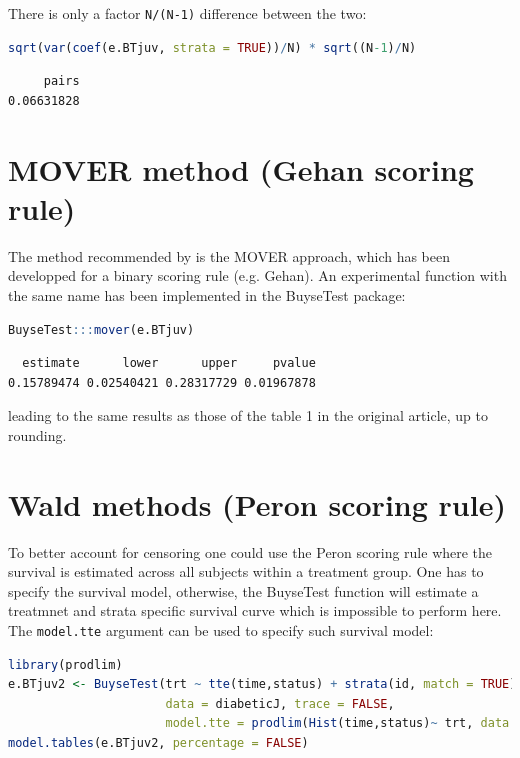 \documentclass[12pt]{article}
\begin{document}
There is only a factor \texttt{N/(N-1)} difference between the two:
\begin{lstlisting}[language=r,numbers=none]
sqrt(var(coef(e.BTjuv, strata = TRUE))/N) * sqrt((N-1)/N)
\end{lstlisting}

\label{}
\begin{verbatim}
     pairs 
0.06631828
\end{verbatim}
\section{MOVER method (Gehan scoring rule)}
\label{sec:org121445d}

The method recommended by \cite{matsouaka2022robust} is the MOVER
approach, which has been developped for a binary scoring rule
(e.g. Gehan). An experimental function with the same name has been
implemented in the BuyseTest package:

\begin{lstlisting}[language=r,numbers=none]
BuyseTest:::mover(e.BTjuv)
\end{lstlisting}
\label{}
\begin{verbatim}
  estimate      lower      upper     pvalue 
0.15789474 0.02540421 0.28317729 0.01967878
\end{verbatim}


leading to the same results as those of the table 1 in the original article, up to rounding.

\clearpage
\section{Wald methods (Peron scoring rule)}
\label{sec:org94f1d11}

To better account for censoring one could use the Peron scoring rule
where the survival is estimated across all subjects within a treatment
group. One has to specify the survival model, otherwise, the BuyseTest
function will estimate a treatmnet and strata specific survival curve
which is impossible to perform here. The \texttt{model.tte} argument can be
used to specify such survival model:
\begin{lstlisting}[language=r,numbers=none]
library(prodlim)
e.BTjuv2 <- BuyseTest(trt ~ tte(time,status) + strata(id, match = TRUE), 
                      data = diabeticJ, trace = FALSE,
                      model.tte = prodlim(Hist(time,status)~ trt, data = diabeticJ))
model.tables(e.BTjuv2, percentage = FALSE)
\end{lstlisting}
\end{document}
